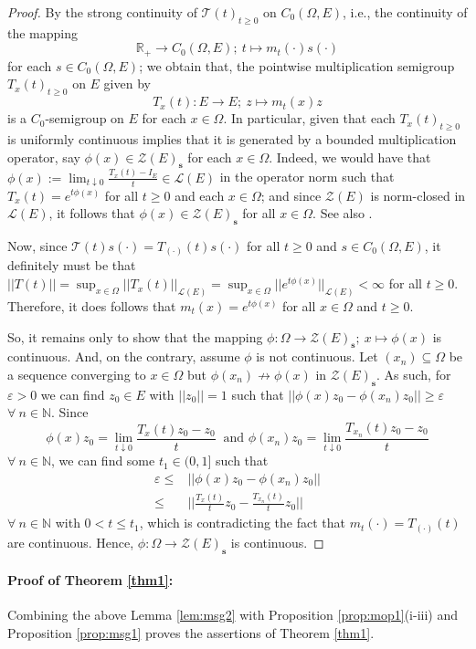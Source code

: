 \documentclass{article}
\newcommand{\Bm}[1]{ \boldsymbol{ #1 }}
\newcommand{\R}{\mathbb{R}}
\newcommand{\N}{\mathbb{N}}
\newcommand{\sL}{\mathscr{L}}
\newcommand{\mZ}{\mathcal{Z}}
\newcommand{\mT}{\mathcal{T}}
\newcommand{\ep}{\varepsilon}
\newcommand{\ty}{\infty}
\newcommand{\cd}{\cdot}
\newcommand{\da}{\downarrow}
\newcommand{\lo}{\longrightarrow}
\newcommand{\sse}{\subseteq}
\newcommand{\Om}{\Omega}
\newcommand{\mt}{\mapsto}
\newcommand{\beqan}{\[\begin{aligned}}
\newcommand{\eeqan}{\end{aligned}\]}
\begin{document}
\begin{proof}

By the strong continuity of $\mT(t)_{t\ge0}$ on $C_0(\Om, E)$, i.e., the continuity of the mapping
\[  \R_+ \lo C_0(\Om, E);\ t \mt m_t(\cd)s(\cd)  \]
 for each $s\in C_0(\Om, E)$; we obtain that, the pointwise multiplication semigroup $T_x(t)_{t\ge0}$ on $E$ given by
 \[ T_x(t) : E \lo E; \ z \mt m_t(x)z      \]
is a $C_0$-semigroup on $E$ for each $x\in\Om$. 
In particular, given that each $T_x(t)_{t\ge0}$  is uniformly continuous implies that it is generated by a bounded multiplication operator, say $\phi(x)\in\Bm{\mZ}(E)_\textbf{s}$ for each $x\in\Om$. Indeed, we would have that $\phi(x):=\lim_{t\da 0} \frac{T_x(t) -I_E}{t} \in\sL(E)$ in the operator norm  such that $T_x(t)= e^{t\phi(x)}$  for all $t\ge0$ and each $x\in\Om$; and since $\Bm{\mZ}(E)$ is norm-closed in $\sL(E)$, it follows that $\phi(x)\in \Bm{\mZ}(E)_\textbf{s}$ for all $x\in\Om.$ See also \cite[Proposition 5.15, p.288]{arendt1986}.


Now, since $\mT(t)s(\cd) = T_{(\cd)}(t)s(\cd)$ for all $t\ge0$ and $s\in C_0(\Om, E)$, it definitely must be that $||T(t)||=\sup_{x\in\Om}||T_x(t)||_{\sL(E)} = \sup_{x\in\Om}||e^{t\phi(x)}||_{\sL(E)}<\ty$ for all $t\ge0$. Therefore, it does follows that $m_t(x)= e^{t\phi(x)}$ for all $x\in\Om$ and $t\ge0.$ \bigskip

So, it remains only to show that the mapping $\phi : \Om \lo \Bm{\mZ}(E)_\textbf{s};\ x\mapsto\phi(x)$ is continuous. And, on the contrary, assume $\phi$ is not continuous. Let $(x_n)\sse\Om$ be a sequence converging to $x\in\Om$ but $\phi(x_n) \nrightarrow \phi(x)$ in $\Bm{\mZ}(E)_\textbf{s}$. As such, for $\ep>0$ we can find $z_0\in E$ with $||z_0||=1$ such that $  ||\phi(x)z_0 - \phi(x_n)z_0||\ge\ep$ $ \forall\ n\in\N$. Since
\[\phi(x)z_0  = \lim_{t\da 0} \frac{T_x(t)z_0 -z_0}{t} \ \text{ and } \phi(x_n)z_0= \lim_{t\da 0} \frac{T_{x_n}(t)z_0 -z_0}{t}\]
  $ \forall\ n\in\N$, we can find some $t_1\in(0,1]$ such that 
	\beqan
\ep	\le & ||\phi(x)z_0 - \phi(x_n)z_0||   \\
\le   & ||  \frac{T_x(t)}{t}z_0 - \frac{T_{x_n}(t)}{t}z_0 ||
\eeqan
$ \forall\ n\in\N$  with $0<t\le t_1$, which is contradicting the fact that $m_t(\cd)=T_{(\cd)}(t)$ are continuous. Hence,  $\phi : \Om \lo \Bm{\mZ}(E)_\textbf{s}$ is continuous.

\end{proof}



\paragraph{Proof of Theorem \ref{thm1}:} Combining the above Lemma \ref{lem:msg2}  with Proposition \ref{prop:mop1}(i-iii) and Proposition \ref{prop:msg1} proves the assertions of Theorem \ref{thm1}.
\end{document}
